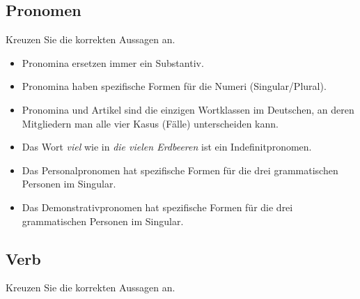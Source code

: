 \documentclass[12pt,a4paper,twoside]{article}
\newcommand{\FUBreak}{\clearpage}
\newcommand{\FSUBreak}{}
\newcommand{\FUHalbzeile}{\hspace{0.5\baselineskip}}
\newcommand{\FUBreak}{}
\newcommand{\FSUBreak}{\clearpage}
\newcommand{\FUHalbzeile}{}
\newcommand{\Lf}{
  \setlength{\itemsep}{1pt}
  \setlength{\parskip}{0pt}
  \setlength{\parsep}{0pt}
}
\begin{document}

\FUBreak
\FSUBreak

\subsection{Pronomen}

Kreuzen Sie die korrekten Aussagen an.

\begin{itemize}[label=\Square]\Lf
  \item Pronomina ersetzen immer ein Substantiv.
  \item Pronomina haben spezifische Formen für die Numeri (Singular\slash Plural).
  \item Pronomina und Artikel sind die einzigen Wortklassen im Deutschen, an deren Mitgliedern man alle vier Kasus (Fälle) unterscheiden kann.
  \item Das Wort \textit{viel} wie in \textit{die vielen Erdbeeren} ist ein Indefinitpronomen.
  \item Das Personalpronomen hat spezifische Formen für die drei grammatischen Personen im Singular.
  \item Das Demonstrativpronomen hat spezifische Formen für die drei grammatischen Personen im Singular.
\end{itemize}

\FUHalbzeile

\subsection{Verb}

Kreuzen Sie die korrekten Aussagen an.
\end{document}

